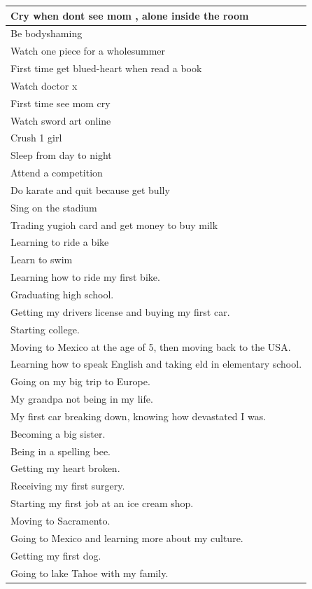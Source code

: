 \documentclass[
  .7em,
  letterpaper,
  DIV=11,
  numbers=noendperiod]{scrartcl}
\begin{document}
\begin{table}
\begin{tabular}{l}
\hline
Cry when dont see mom , alone inside the room\\
\hline
Be bodyshaming\\
\hline
Watch one piece for a wholesummer\\
\hline
First time get blued-heart when read a book\\
\hline
Watch doctor x\\
\hline
First time see mom cry\\
\hline
Watch sword art online\\
\hline
Crush 1 girl\\
\hline
Sleep from day to night\\
\hline
Attend a competition\\
\hline
Do karate and quit because get bully\\
\hline
Sing on the stadium\\
\hline
Trading yugioh card and get money to buy milk\\
\hline
Learning to ride a bike\\
\hline
Learn to swim\\
\hline
Learning how to ride my first bike.\\
\hline
Graduating high school.\\
\hline
Getting my drivers license and buying my first car.\\
\hline
Starting college.\\
\hline
Moving to Mexico at the age of 5, then moving back to the USA.\\
\hline
Learning how to speak English and taking eld in elementary school.\\
\hline
Going on my big trip to Europe.\\
\hline
My grandpa not being in my life.\\
\hline
My first car breaking down, knowing how devastated I was.\\
\hline
Becoming a big sister.\\
\hline
Being in a spelling bee.\\
\hline
Getting my heart broken.\\
\hline
Receiving my first surgery.\\
\hline
Starting my first job at an ice cream shop.\\
\hline
Moving to Sacramento.\\
\hline
Going to Mexico and learning more about my culture.\\
\hline
Getting my first dog.\\
\hline
Going to lake Tahoe with my family.\\

\end{tabular}
\end{table}
\end{document}
